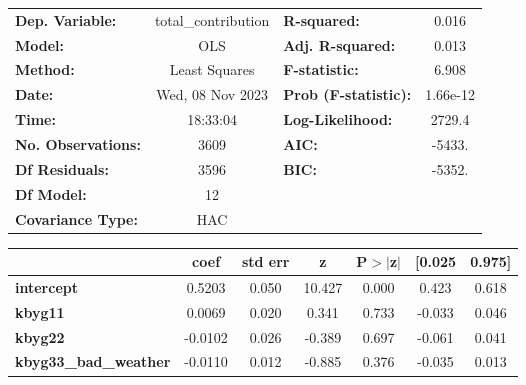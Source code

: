 \begin{center}
\begin{tabular}{lclc}
\toprule
\textbf{Dep. Variable:}                      & total\_contribution & \textbf{  R-squared:         } &     0.016   \\
\textbf{Model:}                              &         OLS         & \textbf{  Adj. R-squared:    } &     0.013   \\
\textbf{Method:}                             &    Least Squares    & \textbf{  F-statistic:       } &     6.908   \\
\textbf{Date:}                               &   Wed, 08 Nov 2023  & \textbf{  Prob (F-statistic):} &  1.66e-12   \\
\textbf{Time:}                               &       18:33:04      & \textbf{  Log-Likelihood:    } &    2729.4   \\
\textbf{No. Observations:}                   &          3609       & \textbf{  AIC:               } &    -5433.   \\
\textbf{Df Residuals:}                       &          3596       & \textbf{  BIC:               } &    -5352.   \\
\textbf{Df Model:}                           &            12       & \textbf{                     } &             \\
\textbf{Covariance Type:}                    &         HAC         & \textbf{                     } &             \\
\bottomrule
\end{tabular}
\begin{tabular}{lcccccc}
                                             & \textbf{coef} & \textbf{std err} & \textbf{z} & \textbf{P$> |$z$|$} & \textbf{[0.025} & \textbf{0.975]}  \\
\midrule
\textbf{intercept}                           &       0.5203  &        0.050     &    10.427  &         0.000        &        0.423    &        0.618     \\
\textbf{kbyg11}                              &       0.0069  &        0.020     &     0.341  &         0.733        &       -0.033    &        0.046     \\
\textbf{kbyg22}                              &      -0.0102  &        0.026     &    -0.389  &         0.697        &       -0.061    &        0.041     \\
\textbf{kbyg33\_bad\_weather}                &      -0.0110  &        0.012     &    -0.885  &         0.376        &       -0.035    &        0.013     \\

\end{tabular}
\end{center}
